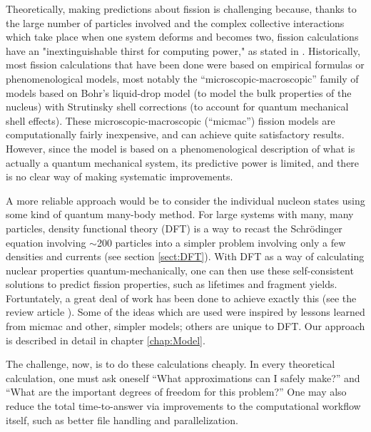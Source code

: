 Theoretically, making predictions about fission is challenging because, thanks to the large number of particles involved and the complex collective interactions which take place when one system deforms and becomes two, fission calculations have an "inextinguishable thirst for computing power," as stated in \cite{Schunck2016}. Historically, most fission calculations that have been done were based on empirical formulas or phenomenological models, most notably the ``microscopic-macroscopic'' family of models based on Bohr's liquid-drop model (to model the bulk properties of the nucleus) with Strutinsky shell corrections (to account for quantum mechanical shell effects). These microscopic-macroscopic (``micmac'') fission models are computationally fairly inexpensive, and can achieve quite satisfactory results. However, since the model is based on a phenomenological description of what is actually a quantum mechanical system, its predictive power is limited, and there is no clear way of making systematic improvements.

A more reliable approach would be to consider the individual nucleon states using some kind of quantum many-body method. For large systems with many, many particles, density functional theory (DFT) is a way to recast the Schr\"{o}dinger equation involving $\sim$200 particles into a simpler problem involving only a few densities and currents (see section \ref{sect:DFT}). With DFT as a way of calculating nuclear properties quantum-mechanically, one can then use these self-consistent solutions to predict fission properties, such as lifetimes and fragment yields. Fortuntately, a great deal of work has been done to achieve exactly this (see the review article \cite{Schunck2016}). Some of the ideas which are used were inspired by lessons learned from micmac and other, simpler models; others are unique to DFT. Our approach is described in detail in chapter \ref{chap:Model}.

The challenge, now, is to do these calculations cheaply. In every theoretical calculation, one must ask oneself ``What approximations can I safely make?'' and ``What are the important degrees of freedom for this problem?'' One may also reduce the total time-to-answer via improvements to the computational workflow itself, such as better file handling and parallelization.

